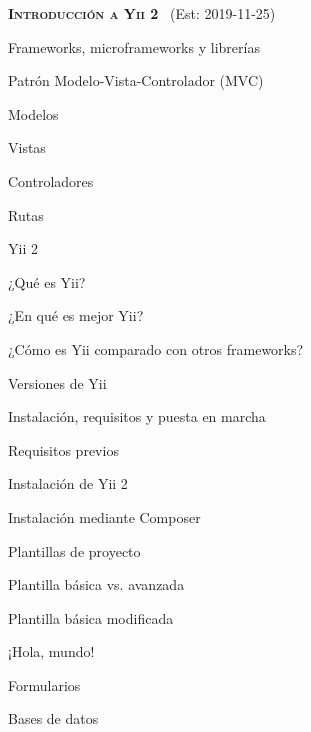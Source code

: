 \begin{longenum}
\begin{longenum}
\begin{longenum}
        \end{longenum}
    \end{longenum}
    \item \textbf{\textsc{Introducción a Yii 2}} \ (Est: 2019-11-25)
    \begin{longenum}
        \item Frameworks, microframeworks y librerías
        \item Patrón Modelo-Vista-Controlador (MVC)
        \begin{longenum}
            \item Modelos
            \item Vistas
            \item Controladores
            \item Rutas
        \end{longenum}
        \item Yii 2
        \begin{longenum}
            \item ¿Qué es Yii?
            \item ¿En qué es mejor Yii?
            \item ¿Cómo es Yii comparado con otros frameworks?
            \item Versiones de Yii
        \end{longenum}
        \item Instalación, requisitos y puesta en marcha
        \begin{longenum}
            \item Requisitos previos
            \item Instalación de Yii 2
            \begin{longenum}
                \item Instalación mediante Composer
            \end{longenum}
            \item Plantillas de proyecto
            \begin{longenum}
                \item Plantilla básica vs. avanzada
                \item Plantilla básica modificada
            \end{longenum}
        \end{longenum}
        \item ¡Hola, mundo!
        \item Formularios
        \item Bases de datos

\end{longenum}
\end{longenum}

